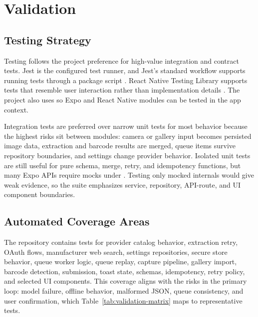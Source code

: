 \chapter{Validation}
\label{chap:validation}

\section{Testing Strategy}

Testing follows the project preference for high-value integration and contract tests. Jest is the configured test runner, and Jest's standard workflow supports running tests through a package script \cite{jest}. React Native Testing Library supports tests that resemble user interaction rather than implementation details \cite{rntl}. The project also uses  so Expo and React Native modules can be tested in the app context.

Integration tests are preferred over narrow unit tests for most behavior because the highest risks sit between modules: camera or gallery input becomes persisted image data, extraction and barcode results are merged, queue items survive repository boundaries, and settings change provider behavior. Isolated unit tests are still useful for pure schema, merge, retry, and idempotency functions, but many Expo APIs require mocks under . Testing only mocked internals would give weak evidence, so the suite emphasizes service, repository, API-route, and UI component boundaries.

\section{Automated Coverage Areas}

The repository contains tests for provider catalog behavior, extraction retry, OAuth flows, manufacturer web search, settings repositories, secure store behavior, queue worker logic, queue replay, capture pipeline, gallery import, barcode detection, submission, toast state, schemas, idempotency, retry policy, and selected UI components. This coverage aligns with the risks in the primary loop: model failure, offline behavior, malformed JSON, queue consistency, and user confirmation, which Table~\ref{tab:validation-matrix} maps to representative tests.

